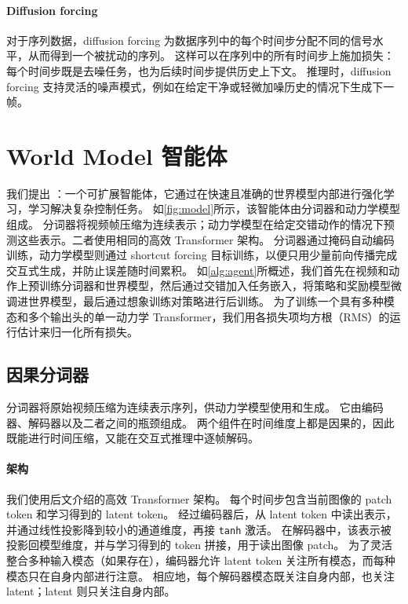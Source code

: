 \documentclass[11pt]{article}
\begin{document}
\paragraph{Diffusion forcing}

对于序列数据，diffusion forcing\citep{diffusionforcing} 为数据序列中的每个时间步分配不同的信号水平，从而得到一个被扰动的序列。
这样可以在序列中的所有时间步上施加损失：每个时间步既是去噪任务，也为后续时间步提供历史上下文。
推理时，diffusion forcing 支持灵活的噪声模式，例如在给定干净或轻微加噪历史的情况下生成下一帧。

\pagebreak
\section{World Model 智能体}


我们提出 \method：一个可扩展智能体，它通过在快速且准确的世界模型内部进行强化学习，学习解决复杂控制任务。
如\cref{fig:model}所示，该智能体由分词器和动力学模型组成。
分词器将视频帧压缩为连续表示；动力学模型在给定交错动作的情况下预测这些表示。二者使用相同的高效 Transformer 架构。
分词器通过掩码自动编码训练，动力学模型则通过 shortcut forcing 目标训练，以便只用少量前向传播完成交互式生成，并防止误差随时间累积。
如\cref{alg:agent}所概述，我们首先在视频和动作上预训练分词器和世界模型，然后通过交错加入任务嵌入，将策略和奖励模型微调进世界模型，最后通过想象训练对策略进行后训练。
为了训练一个具有多种模态和多个输出头的单一动力学 Transformer，我们用各损失项均方根（RMS）的运行估计来归一化所有损失。



\pagebreak
\subsection{因果分词器}
\label{sec:tokenizer}

分词器将原始视频压缩为连续表示序列，供动力学模型使用和生成。
它由编码器、解码器以及二者之间的瓶颈组成。
两个组件在时间维度上都是因果的，因此既能进行时间压缩，又能在交互式推理中逐帧解码。

\paragraph{架构}

我们使用后文介绍的高效 Transformer 架构。
每个时间步包含当前图像的 patch token 和学习得到的 latent token。
经过编码器后，从 latent token 中读出表示，并通过线性投影降到较小的通道维度，再接 \texttt{tanh} 激活。
在解码器中，该表示被投影回模型维度，并与学习得到的 token 拼接，用于读出图像 patch。
为了灵活整合多种输入模态（如果存在），编码器允许 latent token 关注所有模态，而每种模态只在自身内部进行注意。
相应地，每个解码器模态既关注自身内部，也关注 latent；latent 则只关注自身内部。
\end{document}
